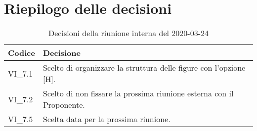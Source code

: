 \section{Riepilogo delle decisioni}
\begin{longtable}{ 
	 >{\centering}p{} >{}p{} }
	
	\caption{Decisioni della riunione interna del 2020-03-24}\\	
	
	\textbf{\color{white}Codice} & 
	\textbf{\color{white}Decisione} 
	\tabularnewline  
	\endhead
	
	VI\_7.1 & Scelto di organizzare la struttura delle figure con l'opzione [H]. \\
	VI\_7.2 & Scelto di non fissare la prossima riunione esterna con il Proponente. \\
	VI\_7.5 & Scelta data per la prossima riunione. \\
	
\end{longtable}